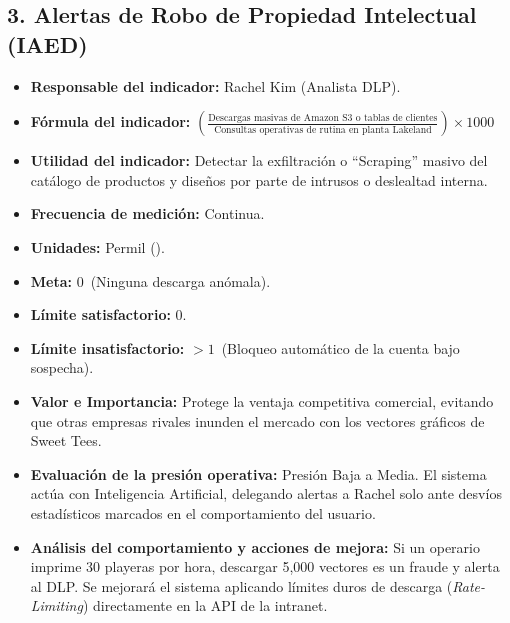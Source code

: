 \documentclass[11pt,a4paper]{article}
\begin{document}
\subsection{3. Alertas de Robo de Propiedad Intelectual (IAED)}
\begin{itemize}[label={--}, itemsep=0.1cm]
    \item \textbf{Responsable del indicador:} Rachel Kim (Analista DLP).
    \item \textbf{Fórmula del indicador:} $\left(\frac{\text{Descargas masivas de Amazon S3 o tablas de clientes}}{\text{Consultas operativas de rutina en planta Lakeland}}\right) \times 1000$
    \item \textbf{Utilidad del indicador:} Detectar la exfiltración o \enquote{Scraping} masivo del catálogo de productos y diseños por parte de intrusos o deslealtad interna.
    \item \textbf{Frecuencia de medición:} Continua.
    \item \textbf{Unidades:} Permil (\textperthousand).
    \item \textbf{Meta:} 0\textperthousand\ (Ninguna descarga anómala).
    \item \textbf{Límite satisfactorio:} 0\textperthousand.
    \item \textbf{Límite insatisfactorio:} $> 1$\textperthousand\ (Bloqueo automático de la cuenta bajo sospecha).
    \item \textbf{Valor e Importancia:} Protege la ventaja competitiva comercial, evitando que otras empresas rivales inunden el mercado con los vectores gráficos de Sweet Tees.
    \item \textbf{Evaluación de la presión operativa:} Presión Baja a Media. El sistema actúa con Inteligencia Artificial, delegando alertas a Rachel solo ante desvíos estadísticos marcados en el comportamiento del usuario.
    \item \textbf{Análisis del comportamiento y acciones de mejora:} Si un operario imprime 30 playeras por hora, descargar 5,000 vectores es un fraude y alerta al DLP. Se mejorará el sistema aplicando límites duros de descarga (\textit{Rate-Limiting}) directamente en la API de la intranet.
\end{itemize}
\end{document}
